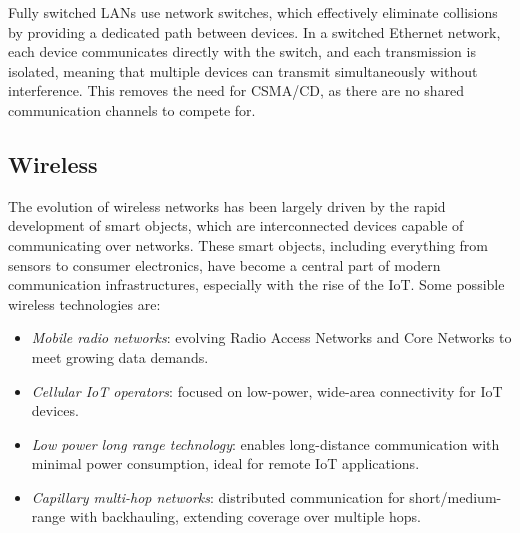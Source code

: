 Fully switched LANs use network switches, which effectively eliminate collisions by providing a dedicated path between devices. 
In a switched Ethernet network, each device communicates directly with the switch, and each transmission is isolated, meaning that multiple devices can transmit simultaneously without interference. 
This removes the need for CSMA/CD, as there are no shared communication channels to compete for.

\subsection{Wireless}
The evolution of wireless networks has been largely driven by the rapid development of smart objects, which are interconnected devices capable of communicating over networks. 
These smart objects, including everything from sensors to consumer electronics, have become a central part of modern communication infrastructures, especially with the rise of the IoT.
Some possible wireless technologies are: 
\begin{itemize}
    \item \textit{Mobile radio networks}: evolving Radio Access Networks and Core Networks to meet growing data demands.
    \item \textit{Cellular IoT operators}: focused on low-power, wide-area connectivity for IoT devices.
    \item \textit{Low power long range technology}: enables long-distance communication with minimal power consumption, ideal for remote IoT applications.
    \item \textit{Capillary multi-hop networks}: distributed communication for short/medium-range with backhauling, extending coverage over multiple hops.
\end{itemize}